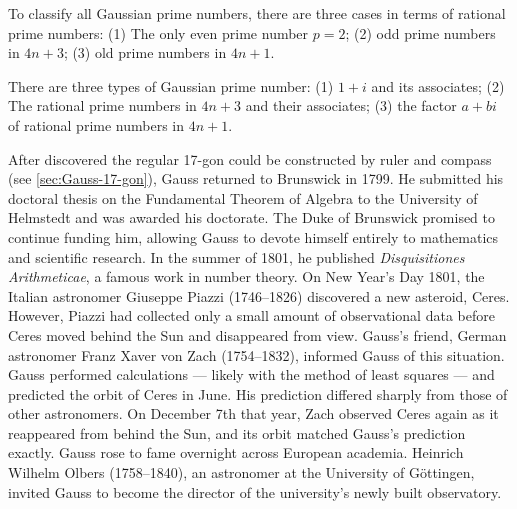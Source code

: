 \documentclass[b5paper]{article}
\begin{document}
To classify all Gaussian prime numbers, there are three cases in terms of rational prime numbers: (1) The only even prime number $p = 2$; (2) odd prime numbers in $4n + 3$; (3) old prime numbers in $4n + 1$.

\begin{theorem}
There are three types of Gaussian prime number: (1) $1 + i$ and its associates; (2) The rational prime numbers in $4n + 3$ and their associates; (3) the factor $a + bi$ of rational prime numbers in $4n + 1$.
\end{theorem}

\begin{mdframed}
After discovered the regular 17-gon could be constructed by ruler and compass (see \cref{sec:Gauss-17-gon}), Gauss returned to Brunswick in 1799. He submitted his doctoral thesis on the Fundamental Theorem of Algebra to the University of Helmstedt and was awarded his doctorate. The Duke of Brunswick promised to continue funding him, allowing Gauss to devote himself entirely to mathematics and scientific research. In the summer of 1801, he published \emph{Disquisitiones Arithmeticae}, a famous work in number theory. On New Year's Day 1801, the Italian astronomer Giuseppe Piazzi (1746–1826) discovered a new asteroid, Ceres. However, Piazzi had collected only a small amount of observational data before Ceres moved behind the Sun and disappeared from view. Gauss's friend, German astronomer Franz Xaver von Zach (1754–1832), informed Gauss of this situation. Gauss performed calculations — likely with the method of least squares — and predicted the orbit of Ceres in June. His prediction differed sharply from those of other astronomers. On December 7th that year, Zach observed Ceres again as it reappeared from behind the Sun, and its orbit matched Gauss's prediction exactly. Gauss rose to fame overnight across European academia. Heinrich Wilhelm Olbers (1758–1840), an astronomer at the University of Göttingen, invited Gauss to become the director of the university's newly built observatory.


\end{mdframed}
\end{document}
